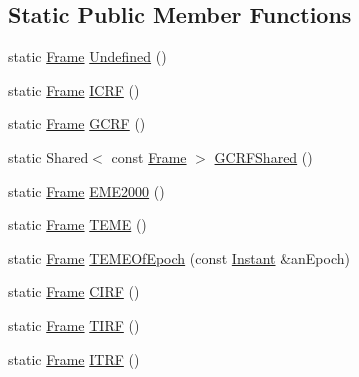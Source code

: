 \subsection*{Static Public Member Functions}
\begin{DoxyCompactItemize}
\item 
static \hyperlink{classlibrary_1_1physics_1_1coord_1_1_frame}{Frame} \hyperlink{classlibrary_1_1physics_1_1coord_1_1_frame_a60d6629cb3ae2e58137dfe912ab8294c}{Undefined} ()
\item 
static \hyperlink{classlibrary_1_1physics_1_1coord_1_1_frame}{Frame} \hyperlink{classlibrary_1_1physics_1_1coord_1_1_frame_a8abd7a55ac68180fa2df1bdf8869ef42}{I\+C\+RF} ()
\item 
static \hyperlink{classlibrary_1_1physics_1_1coord_1_1_frame}{Frame} \hyperlink{classlibrary_1_1physics_1_1coord_1_1_frame_a13d27e609f1dc1b2eed4bfe3d48559a4}{G\+C\+RF} ()
\item 
static Shared$<$ const \hyperlink{classlibrary_1_1physics_1_1coord_1_1_frame}{Frame} $>$ \hyperlink{classlibrary_1_1physics_1_1coord_1_1_frame_a2959dd170a574fe034d11afbd250274d}{G\+C\+R\+F\+Shared} ()
\item 
static \hyperlink{classlibrary_1_1physics_1_1coord_1_1_frame}{Frame} \hyperlink{classlibrary_1_1physics_1_1coord_1_1_frame_a9844ee4c21409aeb5105532c9dd3d89c}{E\+M\+E2000} ()
\item 
static \hyperlink{classlibrary_1_1physics_1_1coord_1_1_frame}{Frame} \hyperlink{classlibrary_1_1physics_1_1coord_1_1_frame_a187b1f1c49486503ad6860f7f1f2d257}{T\+E\+ME} ()
\item 
static \hyperlink{classlibrary_1_1physics_1_1coord_1_1_frame}{Frame} \hyperlink{classlibrary_1_1physics_1_1coord_1_1_frame_a467ed2b006004b1462cb168aeaf100e3}{T\+E\+M\+E\+Of\+Epoch} (const \hyperlink{classlibrary_1_1physics_1_1time_1_1_instant}{Instant} \&an\+Epoch)
\item 
static \hyperlink{classlibrary_1_1physics_1_1coord_1_1_frame}{Frame} \hyperlink{classlibrary_1_1physics_1_1coord_1_1_frame_aa9611712aad853baaf3c197a27f5d496}{C\+I\+RF} ()
\item 
static \hyperlink{classlibrary_1_1physics_1_1coord_1_1_frame}{Frame} \hyperlink{classlibrary_1_1physics_1_1coord_1_1_frame_a804d443561933b478a4116dda2d30287}{T\+I\+RF} ()
\item 
static \hyperlink{classlibrary_1_1physics_1_1coord_1_1_frame}{Frame} \hyperlink{classlibrary_1_1physics_1_1coord_1_1_frame_ac6ce00926b0c28bb2cca01882a67dfa0}{I\+T\+RF} ()
\end{DoxyCompactItemize}
